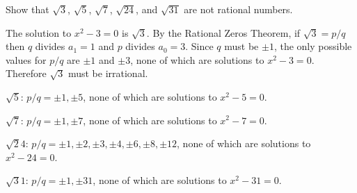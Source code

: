 
Show that $\sqrt3$, $\sqrt5$, $\sqrt7$, $\sqrt{24}$, and
$\sqrt{31}$ are not rational numbers.

\medskip
The solution to $x^2-3=0$ is $\sqrt3$.
By the Rational Zeros Theorem, if $\sqrt3=p/q$ then
$q$ divides $a_1=1$ and $p$ divides $a_0=3$.
Since $q$ must be $\pm1$, the only possible values for
$p/q$ are $\pm1$ and $\pm3$, none of which are
solutions to $x^2-3=0$.
Therefore $\sqrt3$ must be irrational.

$\sqrt5$: $p/q=\pm1,\pm5$, none of which are
solutions to $x^2-5=0$.

$\sqrt7$: $p/q=\pm1,\pm7$, none of which are
solutions to $x^2-7=0$.

$\sqrt24$: $p/q=\pm1,\pm2,\pm3,\pm4,\pm6,\pm8,\pm12$,
none of which are solutions to $x^2-24=0$.

$\sqrt31$: $p/q=\pm1,\pm31$, none of which are
solutions to $x^2-31=0$.
